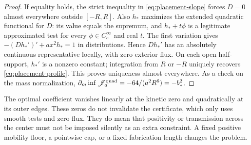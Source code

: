 \begin{proof}
If equality holds, the strict inequality in
\eqref{eq:placement-slope} forces $D=0$ almost everywhere outside
$[-R,R]$. Also $h_*$ maximizes the extended quadratic functional for
$D$: its value equals the supremum, and $h_*+t\phi$ is a legitimate
approximated test for every $\phi\in C_c^\infty$ and real $t$.
The first variation gives
$-(Dh_*')'+ax^2h_*=1$ in distributions. Hence $Dh_*'$ has an
absolutely continuous representative locally, with zero exterior
flux. On each open half-support, $h_*'$ is a nonzero constant;
integration from $R$ or $-R$ uniquely recovers
\eqref{eq:placement-profile}. This proves uniqueness almost everywhere.
As a check on the mass normalization,
$\partial_m\inf\mathscr J_a^{\rm quad}=-64/(a^2R^6)=-b_*^2$.
\end{proof}

The optimal coefficient vanishes linearly at the kinetic zero and
quadratically at its outer edges. These zeros do not invalidate the
certificate, which only uses smooth tests and zero flux. They do mean
that positivity or transmission across the center must not be imposed
silently as an extra constraint. A fixed positive mobility floor,
a pointwise cap, or a fixed fabrication length changes the problem.

